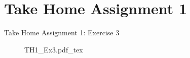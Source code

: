 




\section{Take Home Assignment 1}

\begin{frame}{Take Home Assignment 1: Exercise 3}
  \begin{figure}[!h]
    \begin{center}
    \def\svgwidth{1.0\columnwidth}
    {TH1_Ex3.pdf_tex}
    \end{center}
  \end{figure}
\end{frame}


